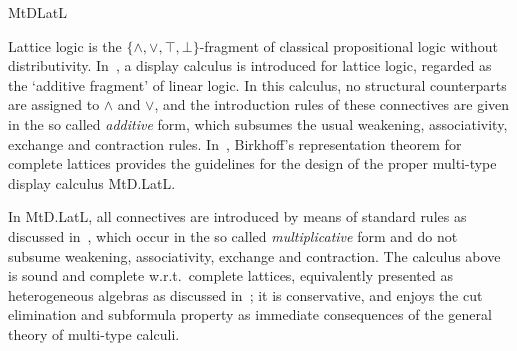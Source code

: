 \begin{entry}{MtDLatL}
\begin{history} 
  Lattice logic is the $\{\wedge, \vee, \top, \bot\}$-fragment of classical
  propositional logic without distributivity. In~\cite{Belnap1990}, a display
  calculus is introduced for lattice logic, regarded as the `additive fragment' of
  linear logic. In this calculus, no  structural counterparts are assigned  to
  $\wedge$ and $\vee$, and the introduction rules of these connectives are given
  in the so called {\em additive} form, which subsumes the usual weakening,
  associativity, exchange and contraction rules. In~\cite{GrecoPalmigiano2017},
  Birkhoff's representation theorem for complete lattices provides the guidelines
  for the design of the proper multi-type display calculus MtD.LatL.
\end{history}

\begin{technicalities}
  In MtD.LatL, all connectives are introduced by means of standard rules as
  discussed in~, which occur in the so called {\em multiplicative} form
  and do not subsume weakening, associativity, exchange and contraction. The
  calculus above is sound and complete w.r.t.~complete lattices, equivalently
  presented as heterogeneous algebras as discussed  in~\cite{GrecoPalmigiano2017};
  it is conservative, and enjoys the cut elimination and subformula property as
  immediate consequences of the general theory of multi-type calculi.
\end{technicalities}

\end{entry}
